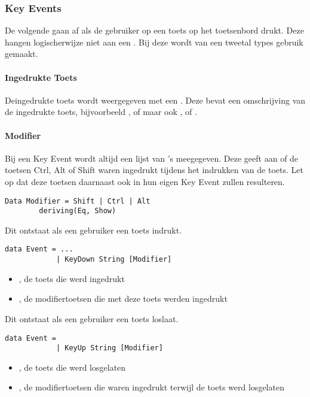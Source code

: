 \subsubsection{Key Events}
De volgende \events gaan af als de gebruiker op een toets op het toetsenbord drukt. Deze hangen logischerwijze niet aan een \shape. 
Bij deze \events wordt van een tweetal types gebruik gemaakt. 

\paragraph{Ingedrukte Toets}
Deingedrukte toets wordt weergegeven met een . Deze bevat een omschrijving van de ingedrukte toets, bijvoorbeeld ,  of  maar ook ,  of .

\paragraph{Modifier}
Bij een Key Event wordt altijd een lijst van 's meegegeven. Deze geeft aan of de toetsen Ctrl, Alt of Shift waren ingedrukt tijdens het indrukken van de toets. Let op dat deze toetsen daarnaast ook in hun eigen Key Event zullen resulteren.
\begin{lstlisting}
Data Modifier = Shift | Ctrl | Alt
		deriving(Eq, Show)
\end{lstlisting}

Dit  ontstaat als een gebruiker een toets indrukt.
\begin{lstlisting}
data Event = ...
			| KeyDown String [Modifier]
\end{lstlisting}
\begin{itemize}
	\item {}, de toets die werd ingedrukt
	\item \type{[Modifier]}, de modifiertoetsen die met deze toets werden ingedrukt
\end{itemize}

Dit  ontstaat als een gebruiker een toets loslaat.
\begin{lstlisting}
data Event =
			| KeyUp String [Modifier]
\end{lstlisting}
\begin{itemize}
	\item {}, de toets die werd losgelaten
	\item \type{[Modifier]}, de modifiertoetsen die waren ingedrukt terwijl de toets werd losgelaten
\end{itemize}


